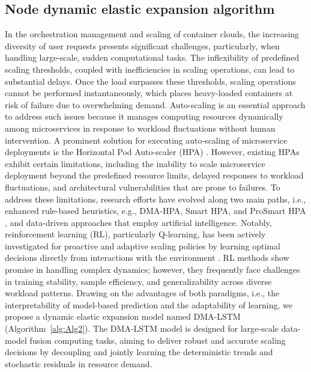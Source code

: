 \documentclass[twoside,twocolumn]{article}
\begin{document}
\subsection{Node dynamic elastic expansion algorithm}

In the orchestration management and scaling of container clouds, the increasing diversity of user requests presents significant challenges, particularly, when handling large-scale, sudden computational tasks. The inflexibility of predefined scaling thresholds, coupled with inefficiencies in scaling operations, can lead to substantial delays. Once the load surpasses these thresholds, scaling operations cannot be performed instantaneously, which places heavy-loaded containers at risk of failure due to overwhelming demand. Auto-scaling is an essential approach to address such issues because it manages computing resources dynamically among microservices in response to workload fluctuations without human intervention. A prominent solution for executing auto-scaling of microservice deployments is the Horizontal Pod Auto-scaler (HPA) \citep{Nguyen2020}. However, existing HPAs exhibit certain limitations, including the inability to scale microservice deployment beyond the predefined resource limits, delayed responses to workload fluctuations, and architectural vulnerabilities that are prone to failures. To address these limitations, research efforts have evolved along two main paths, i.e., enhanced rule-based heuristics, e.g., DMA-HPA, Smart HPA, and ProSmart HPA \citep{Ahmad2025}, and data-driven approaches that employ artificial intelligence. Notably, reinforcement learning (RL), particularly Q-learning, has been actively investigated for proactive and adaptive scaling policies by learning optimal decisions directly from interactions with the environment \citep{Rossi2020}. RL methods show promise in handling complex dynamics; however, they frequently face challenges in training stability, sample efficiency, and generalizability across diverse workload patterns. Drawing on the advantages of both paradigms, i.e., the interpretability of model-based prediction and the adaptability of learning, we propose a dynamic elastic expansion model named DMA-LSTM (Algorithm~\ref{alg:Alg2}). The DMA-LSTM model is designed for large-scale data-model fusion computing tasks, aiming to deliver robust and accurate scaling decisions by decoupling and jointly learning the deterministic trends and stochastic residuals in resource demand.
\end{document}
